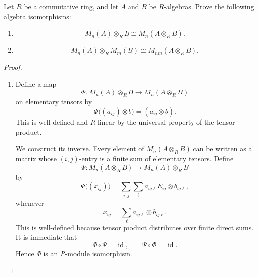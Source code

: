     
    \begin{exercise}
    Let \(R\) be a commutative ring, and let \(A\) and \(B\) be \(R\)-algebras.
    Prove the following algebra isomorphisms:
    \begin{enumerate}
        \item
        \[
            M_n(A)\otimes_R B \cong M_n(A\otimes_R B).
        \]
        \item
        \[
            M_n(A)\otimes_R M_m(B) \cong M_{nm}(A\otimes_R B).
        \]
    \end{enumerate}
    \end{exercise}
    
    \begin{proof}
    \begin{enumerate}
        \item Define a map
              \[
                  \Phi:M_n(A)\otimes_R B\longrightarrow M_n(A\otimes_R B)
              \]
              on elementary tensors by
              \[
                  \Phi\bigl((a_{ij})\otimes b\bigr)
                  =
                  (a_{ij}\otimes b).
              \]
              This is well-defined and \(R\)-linear by the universal property of the
              tensor product.
    
              We construct its inverse. Every element of \(M_n(A\otimes_R B)\) can be
              written as a matrix whose \((i,j)\)-entry is a finite sum of elementary
              tensors. Define
              \[
                  \Psi:M_n(A\otimes_R B)\longrightarrow M_n(A)\otimes_R B
              \]
              by
              \[
                  \Psi\bigl((x_{ij})\bigr)
                  =
                  \sum_{i,j}\sum_\ell
                  a_{ij\ell}E_{ij}\otimes b_{ij\ell},
              \]
              whenever
              \[
                  x_{ij}=\sum_\ell a_{ij\ell}\otimes b_{ij\ell}.
              \]
              This is well-defined because tensor product distributes over finite
              direct sums. It is immediate that
              \[
                  \Phi\circ \Psi=\operatorname{id},
                  \qquad
                  \Psi\circ \Phi=\operatorname{id}.
              \]
              Hence \(\Phi\) is an \(R\)-module isomorphism.
    

\end{enumerate}
\end{proof}
